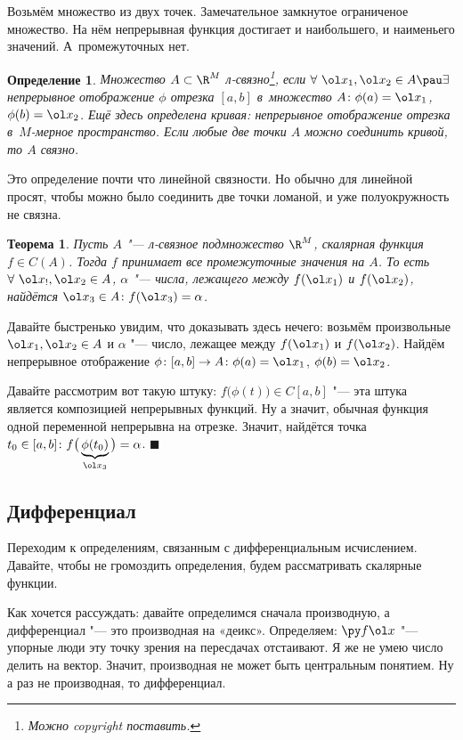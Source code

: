 \documentclass[a4paper,10pt,twoside]{article}
\newtheorem{Def}{Определение}[section]
\newtheorem{The}{Теорема}[section]
\newenvironment{Proof}
       {\par\noindent{\textbf{Доказательство.}}}
       {\hfill$\scriptstyle\blacksquare$}
\begin{document}
	 Возьмём множество из двух точек. Замечательное замкнутое ограниченое множество. На нём непрерывная функция достигает и наибольшего, и наименьего значений. 
	 А~промежуточных нет.
	 \begin{Def}
	 Множество $A\subset \R^M$ л-связно\footnote{Можно copyright поставить.}, если $\forall\ \ol x_1,\ol x_2\in A\pau \exists$
	 непрерывное отображение $\phi$ отрезка $[a,b]$ в~множество $A\colon \phi(a) = \ol x_1$, $\phi(b) = \ol x_2$.
	 Ещё здесь определена кривая: непрерывное отображение отрезка в~$M$-мерное пространство. Если любые две точки $A$ можно соединить кривой, то $A$ связно.
	 \end{Def}
	 Это определение почти что линейной связности. Но обычно для линейной просят, чтобы можно было соединить две точки ломаной, и уже полуокружность не связна.
	 \begin{The}
	 Пусть $A$ "--- л-связное подмножество $\R^M$, скалярная функция $f\in C(A)$. Тогда $f$ принимает все промежуточные значения на $A$.
	 То есть $\forall\ \ol x_!,\ol x_2\in A$, $\alpha$ "--- числа, лежащего между $f(\ol x_1)$ и $f(\ol x_2)$,
	 найдётся $\ol x_3\in A\colon f(\ol x_3) = \alpha$.
	 \end{The}
	 \begin{Proof}
	 Давайте быстренько увидим, что доказывать здесь нечего: возьмём произвольные $\ol x_1,\ol x_2\in A$ и $\alpha$ "--- число, лежащее между
	 $f(\ol x_1)$ и $f(\ol x_2)$. Найдём непрерывное отображение $\phi\colon [a,b]\to A\colon\phi(a) = \ol x_1$, $\phi(b) = \ol x_2$.
	 
	 Давайте рассмотрим вот такую штуку: $f\big(\phi(t)\big)\in C[a,b]$ "--- эта штука является композицией непрерывных функций. Ну а значит, обычная функция одной переменной непрерывна
	 на отрезке. Значит, найдётся точка $t_0\in [a,b]\colon f\big(\underbrace{\phi(t_0)}_{\ol x_3}\big)=\alpha$.
	 \end{Proof}
	 \subsection{Дифференциал}
	 Переходим к определениям, связанным с дифференциальным исчислением. Давайте, чтобы не громоздить определения, будем рассматривать скалярные функции.
	 
	 Как хочется рассуждать: давайте определимся сначала производную, а дифференциал "--- это производная на «деикс».
	 Определяем: $\py f{\ol x}$ "--- упорные люди эту точку зрения на пересдачах отстаивают. Я же не умею число делить на вектор.
	 Значит, производная не может быть центральным понятием. Ну а раз не производная, то дифференциал.
	 
\end{document}
